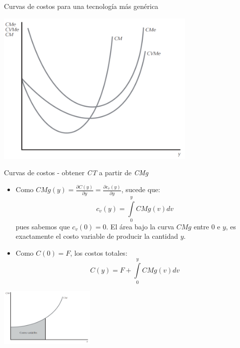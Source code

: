 \documentclass{beamer}
\theoremstyle{definition}
\begin{document}
\begin{frame}{Curvas de costos para una tecnología más genérica}
	\begin{center}
\includegraphics[width=3.8in]{figures4/costostodos.png}
\end{center}
\end{frame}





\begin{frame}{Curvas de costos - obtener \textit{CT} a partir de \textit{CMg}}\small
\begin{itemize}
\item Como $CMg\left( y\right) =\frac{\partial C\left( y\right) }{\partial y}=\frac{\partial c_{v}\left( y\right) }{\partial y}$, sucede que:
\begin{equation*}
c_{v}\left( y\right) =\int\limits_{0}^{y}CMg(v)dv
\end{equation*}
pues sabemos que $c_{v}\left( 0\right) =0$. El \'{a}rea bajo la curva $CMg$ entre $0$ e $y$, es exactamente el costo variable de
producir la cantidad $y.$
\item Como $C\left( 0\right) =F$, los costos
totales:
\begin{equation*}
C(y)=F+\int\limits_{0}^{y}CMg(v)dv
\end{equation*}
\end{itemize}
	\begin{center}
\includegraphics[width=1.8in]{figures4/CV.png}
\end{center}
\end{frame}
\end{document}
